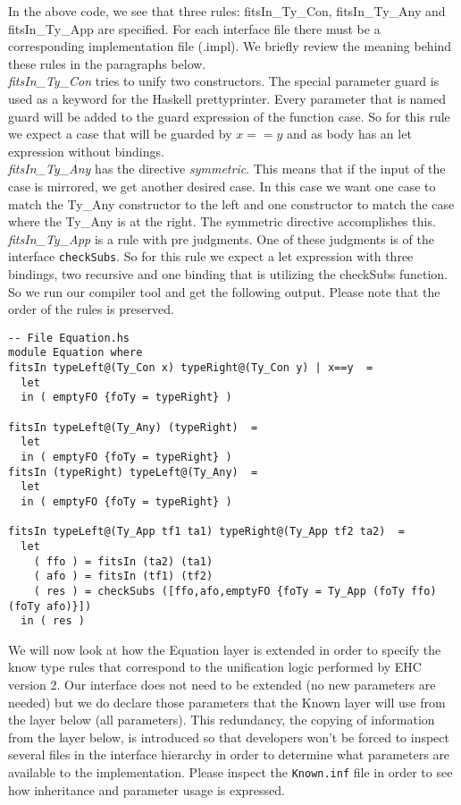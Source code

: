 \documentclass[10pt]{article}
\begin{document}
In the above code, we see that three rules: fitsIn\_Ty\_Con, fitsIn\_Ty\_Any and fitsIn\_Ty\_App are specified.  For each interface file there must be a corresponding implementation file (.impl).  We briefly review the meaning behind these rules in the paragraphs below.\\

\emph{fitsIn\_Ty\_Con} tries to unify two constructors. The special parameter guard is used as a keyword for the Haskell prettyprinter. Every parameter that is named guard will be added to the guard expression of the function case. So for this rule we expect a case that will be guarded by $x == y$ and as body has an let expression without bindings. \\

\emph{fitsIn\_Ty\_Any} has the directive \emph{symmetric}. This means that if the input of the case is mirrored, we get another desired case. In this case we want one case to match the Ty\_Any constructor to the left and one constructor to match the case where the Ty\_Any is at the right. The symmetric directive accomplishes this. \\

\emph{fitsIn\_Ty\_App} is a rule with pre judgments. One of these judgments is of the interface \texttt{checkSubs}. So for this rule we expect a let expression with three bindings, two recursive and one binding that is utilizing the checkSubs function. \\

So we run our compiler tool and get the following  output. Please note that the order of the rules is preserved.
\begin{verbatim}
-- File Equation.hs
module Equation where
fitsIn typeLeft@(Ty_Con x) typeRight@(Ty_Con y) | x==y  =
  let
  in ( emptyFO {foTy = typeRight} )

fitsIn typeLeft@(Ty_Any) (typeRight)  =
  let
  in ( emptyFO {foTy = typeRight} )
fitsIn (typeRight) typeLeft@(Ty_Any)  =
  let
  in ( emptyFO {foTy = typeRight} )

fitsIn typeLeft@(Ty_App tf1 ta1) typeRight@(Ty_App tf2 ta2)  =
  let
    ( ffo ) = fitsIn (ta2) (ta1) 
    ( afo ) = fitsIn (tf1) (tf2) 
    ( res ) = checkSubs ([ffo,afo,emptyFO {foTy = Ty_App (foTy ffo) (foTy afo)}]) 
  in ( res )
\end{verbatim}

We will now look at how the Equation layer is extended in order to specify the know type rules that correspond to the unification logic performed by EHC version 2.  Our interface does not need to be extended (no new parameters are needed) but we do declare those parameters that the Known layer will use from the layer below (all parameters).  This redundancy, the copying of information from the layer below, is introduced so that developers won't be forced to inspect several files in the interface hierarchy in order to determine what parameters are available to the implementation.  Please inspect
the \texttt{Known.inf} file in order to see how inheritance and parameter usage is expressed.\\
\end{document}
